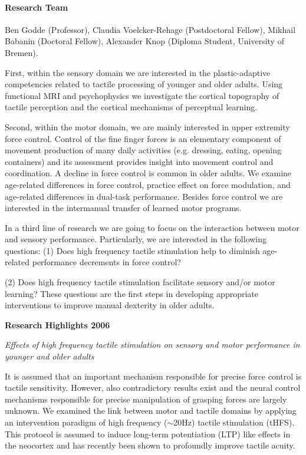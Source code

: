 

\paragraph{Research Team}
Ben Godde (Professor), Claudia Voelcker-Rehage (Postdoctoral Fellow), Mikhail Babanin (Doctoral Fellow), Alexander Knop (Diploma Student, University of Bremen).

First, within the sensory domain we are interested in the plastic-adaptive competencies related to tactile processing of younger and older adults. Using functional MRI and psychophysics we investigate the cortical topography of tactile perception and the cortical mechanisms of perceptual learning.
	
	Second, within the motor domain, we are mainly interested in upper extremity force control. Control of the fine finger forces is an elementary component of movement production of many daily activities (e.g. dressing, eating, opening containers) and its assessment provides insight into movement control and coordination. A decline in force control is common in older adults. We examine age-related differences in force control, practice effect on force modulation, and age-related differences in dual-task performance. Besides force control we are interested in the intermanual transfer of learned motor programs.
	
	In a third line of research we are going to focus on the interaction between motor and sensory performance. Particularly, we are interested in the following questions: (1) Does high frequency tactile stimulation help to diminish age-related performance decrements in force control? 
	
\newpage
(2) Does high frequency tactile stimulation facilitate sensory and/or motor learning? These questions are the first steps in developing appropriate interventions to improve manual dexterity in older adults.

\null
\textbf{Research Highlights 2006}


\textit{Effects of high frequency tactile stimulation on sensory and motor performance in younger and older adults}

	It is assumed that an important mechanism responsible for precise force control is tactile sensitivity. However, also contradictory results exist and the neural control mechanisms responsible for precise manipulation of grasping forces are largely unknown. We examined the link between motor and tactile domains by applying an intervention paradigm of high frequency ($\sim$20Hz) tactile stimulation (tHFS). This protocol is assumed to induce long-term potentiation (LTP) like effects in the neocortex and has recently been shown to profoundly improve tactile acuity. 

